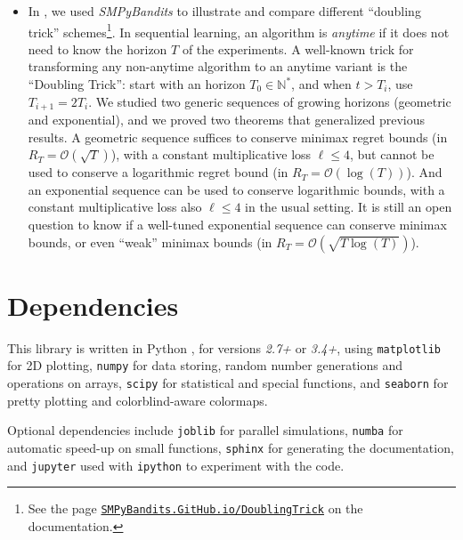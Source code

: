 \documentclass[a4paper,10pt,]{article}
\providecommand{\tightlist}{%
  \setlength{\itemsep}{0pt}\setlength{\parskip}{0pt}}
\begin{document}
\begin{itemize}
\tightlist
\item
  In \citet{Besson2018c}, we used \emph{SMPyBandits} to illustrate and
  compare different ``doubling trick'' schemes\footnote{See the
    page
    \href{https://SMPyBandits.GitHub.io/DoublingTrick.html}{\texttt{SMPyBandits.GitHub.io/DoublingTrick}}
    on the documentation.}. In sequential learning, an algorithm is
  \emph{anytime} if it does not need to know the horizon \(T\) of the
  experiments. A well-known trick for transforming any non-anytime
  algorithm to an anytime variant is the ``Doubling Trick'': start with
  an horizon \(T_0\in\mathbb{N}^*\), and when \(t > T_i\), use
  \(T_{i+1} = 2 T_i\). We studied two generic sequences of growing
  horizons (geometric and exponential), and we proved two theorems that
  generalized previous results. A geometric sequence suffices to conserve minimax
  regret bounds (in \(R_T = \mathcal{O}(\sqrt{T})\)), with a constant
  multiplicative loss \(\ell \leq 4\), but cannot be used to conserve a
  logarithmic regret bound (in \(R_T = \mathcal{O}(\log(T))\)). And an
  exponential sequence can be used to conserve logarithmic bounds, with
  a constant multiplicative loss also \(\ell \leq 4\) in the usual
  setting. It is still an open question to know if a well-tuned
  exponential sequence can conserve minimax bounds, or even ``weak'' minimax
  bounds (in \(R_T = \mathcal{O}(\sqrt{T \log(T)})\)).
\end{itemize}

\section{Dependencies}\label{dependencies}

This library is written in Python \citep{python}, for versions \emph{2.7+} or \emph{3.4+},
using \texttt{matplotlib} \citep{matplotlib} for 2D plotting,
\texttt{numpy} \citep{numpy} for data storing, random number generations
and operations on arrays, \texttt{scipy} \citep{scipy} for
statistical and special functions, and \texttt{seaborn} \citep{seaborn}
for pretty plotting and colorblind-aware colormaps.

Optional dependencies include \texttt{joblib} \citep{joblib} for parallel
simulations, \texttt{numba} \citep{numba} for automatic speed-up on small
functions, \texttt{sphinx} \citep{sphinx} for generating the
documentation, and \texttt{jupyter}
\citep{jupyter} used with \texttt{ipython} \citep{ipython} to experiment
with the code.

\begin{normalsize}
  
\end{normalsize}
\end{document}
